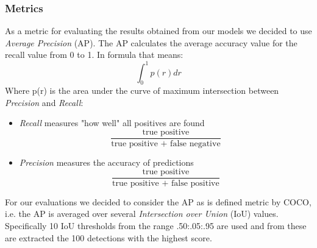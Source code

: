 \documentclass[10pt,twocolumn,letterpaper]{article}
\begin{document}
\subsubsection{Metrics}
As a metric for evaluating the results obtained from our models we decided to use \textit{Average Precision} (AP). The AP calculates the average accuracy value for the recall value from 0 to 1. In formula that means:
\begin{equation}
\int_0^1 p(r) dr 
\label{AP}
\end{equation}
\noindent
Where p(r) is the area under the curve of maximum intersection between \textit{Precision} and \textit{Recall}:
\begin{itemize}
\item \textit{Recall} measures "how well" all positives are found
\begin{equation}
\frac{\text{true positive}}{\text{true positive + false negative}}
\end{equation}
\item \textit{Precision} measures the accuracy of predictions
\begin{equation}
\frac{\text{true positive}}{\text{true positive + false positive}}
\end{equation}
\end{itemize}
\noindent
For our evaluations we decided to consider the AP as is defined metric by COCO, i.e. the AP is averaged over several \textit{Intersection over Union} (IoU) values. Specifically 10 IoU thresholds from the range .50:.05:.95 are used and from these are extracted the 100 detections with the highest score.
\end{document}
